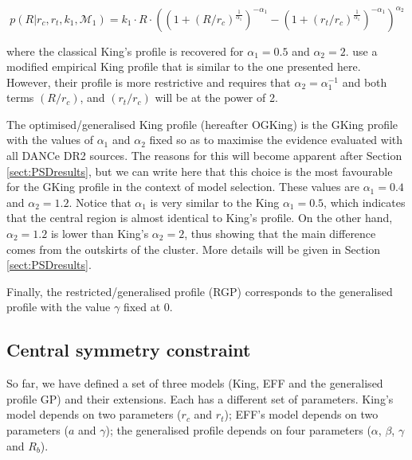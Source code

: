\begin{equation}
  p(R|r_c, r_t, k_1,\mathcal{M}_1)=k_1\cdot R \cdot
  \left(
  \left(1+(R/r_c)^{\frac{1}{\alpha_1}}\right)^{-\alpha_1}
  -
  \left(1+(r_t/r_c)^{\frac{1}{\alpha_1}}\right)^{-\alpha_1}
  \right)^{\alpha_2}
\label{eq:GKing}
\end{equation}

where the classical King's profile is recovered for $\alpha_1=0.5$ and $\alpha_2=2$. \citet{2017MNRAS.466.1513R} use a modified empirical King profile that is similar to the one presented here. However, their profile is more restrictive and requires that $\alpha_2 = \alpha_1^{-1}$  and both terms $(R/r_c)$, and $(r_t/r_c)$ will be at the power of 2.

The optimised/generalised King profile (hereafter OGKing) is the GKing profile with the values of $\alpha_1$ and $\alpha_2$ fixed  so as to maximise the evidence evaluated with all DANCe DR2 sources. The reasons for this will become apparent after Section \ref{sect:PSDresults}, but we can write here that this choice is the most favourable for the GKing profile in the context of model selection. These values are $\alpha_1=0.4$ and $\alpha_2=1.2$. Notice that $\alpha_1$ is very similar to the King $\alpha_1=0.5$, which indicates that the central region is almost identical to King's profile. On the other hand, $\alpha_2=1.2$ is lower than King's $\alpha_2=2$,  thus showing that the main difference comes from the outskirts of the cluster. More details will be given in Section \ref{sect:PSDresults}.

Finally, the restricted/generalised profile (RGP) corresponds to the generalised profile with the value $\gamma$ fixed at 0.



\subsection{Central symmetry constraint}
\label{sect:CentreModels}

So far, we have defined a set of three models (King, EFF and the generalised profile GP) and their extensions. Each has a different set of parameters.  King's model depends on two parameters ($r_c$ and $r_t$); EFF's model depends on two parameters ($a$ and $\gamma$); the generalised profile depends on four parameters ($\alpha$, $\beta$, $\gamma$ and $R_b$).

